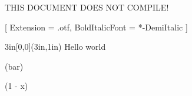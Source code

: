 \documentclass{minimal}
\begin{document}
THIS DOCUMENT DOES NOT COMPILE!

\setmainfont{LucidaBrightOT}[
  Extension = .otf,
  BoldItalicFont = *-DemiItalic
]

\begin{helloworld}[
  Extension = .otf,
  BoldItalicFont = *-DemiItalic
]
\end{helloworld}

\begin{textblock*}{3in}[0,0](3in,1in)
  Hello world
\end{textblock*}

\test \foo(bar)

\varepsilon (1 - x)
\end{document}
